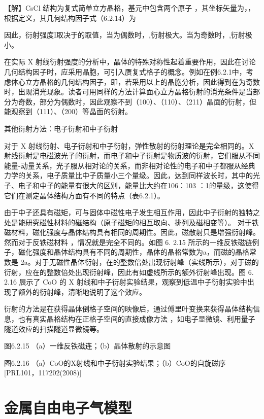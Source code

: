 【解】CsCl 结构为复式简单立方晶格，基元中包含两个原子 ，其坐标矢量为，，根据定义，其几何结构因子式（6.2.14）为



因此，衍射强度I取决于的取值，当为偶数时，,衍射极大。当为奇数时，,衍射极小。

在实际 X 射线衍射强度的分析中，晶体的特殊对称性起着重要作用，因此在讨论几何结构因子时，应采用晶胞，可引入赝复式格子的概念。例如在例6.2.1中，考虑体心立方晶格的几何结构因子，即，若采用以上的晶胞分析，因此得到在为奇数时，出现消光现象。读者可用同样的方法计算面心立方晶格衍射的消光条件是当部分为奇数，部分为偶数时，因此观察不到（100）、（110）、（211）晶面的衍射，但能观察到（111）、（200）等晶面的衍射。

其他衍射方法：电子衍射和中子衍射

对于 X 射线衍射、电子衍射和中子衍射，弹性散射的衍射理论是完全相同的。X 射线衍射是电磁波光子的衍射，而电子和中子衍射是物质波的衍射，它们服从不同能量-动量关系，光子服从相对论的关系，而非相对论性的电子和中子都服从经典力学的关系，电子质量比中子质量小三个量级。因此，达到同样波长时，其中的光子、电子和中子的能量有很大的区别，能量比大约在106：103 ：1的量级，这使得它们在测定晶体结构方面有不同的特点（表6.2.1）。



由于中子还具有磁矩，可与固体中磁性电子发生相互作用，因此中子衍射的独特之处是能研究磁性材料的磁结构（原子磁矩的相互取向、排列及磁相变等）。 对于铁磁材料，磁化强度与晶体结构具有相同的周期性。因此，磁散射只是增强衍射峰。然而对于反铁磁材料 ，情况就是完全不同的。如图 6. 2.15 所示的一维反铁磁链例子，磁化强度和晶体结构具有不同的周期性，晶体的晶格常数为a，而磁的晶格常数是 2a。对于无磁性晶体衍射，在的整数倍处出现衍射峰（实线所示），对于磁的衍射，应在的整数倍处出现衍射峰，因此有如虚线所示的额外衍射峰出现。图 6. 2.16 展示了 CoO 的 X 射线和中子衍射实验结果，观察到低温中子衍射实验中出现了额外的衍射峰，清晰地说明了这个效应。

衍射的方法是在获得晶体倒格子空间的映像后，通过傅里叶变换来获得晶体结构信息，也有真实晶格结构在正格子空间的直接成像方法 ，如电子显微镜、利用量子隧道效应的扫描隧道显微镜等。



图6.2.15 （a）一维反铁磁连；（b）晶体散射的示意图



图6.2.16 （a）CoO的X射线和中子衍射实验结果；（b）CoO的自旋磁序[PRL101，117202(2008)]





\section{金属自由电子气模型}

